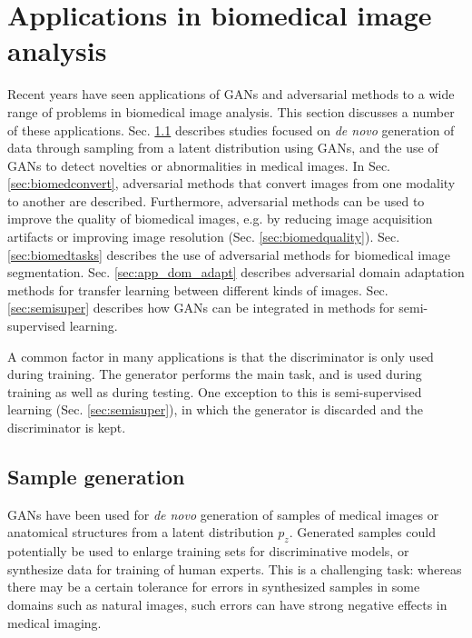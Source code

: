 \documentclass{article}
\begin{document}
\section{Applications in biomedical image analysis}
\label{sec:GANSinMIA}
Recent years have seen applications of GANs and adversarial methods to a wide range of problems in biomedical image analysis. This section discusses a number of these applications. Sec. \ref{sec:biomedsynth} describes studies focused on \textit{de novo} generation of data through sampling from a latent distribution using GANs, and the use of GANs to detect novelties or abnormalities in medical images. In Sec. \ref{sec:biomedconvert}, adversarial methods that convert images from one modality to another are described. Furthermore, adversarial methods can be used to improve the quality of biomedical images, e.g. by reducing image acquisition artifacts or improving image resolution (Sec. \ref{sec:biomedquality}). Sec. \ref{sec:biomedtasks} describes the use of adversarial methods for biomedical image segmentation. Sec. \ref{sec:app_dom_adapt} describes adversarial domain adaptation methods for transfer learning between different kinds of images. Sec. \ref{sec:semisuper} describes how GANs can be integrated in methods for semi-supervised learning.


A common factor in many applications is that the discriminator is only used during training. The generator performs the main task, and is used during training as well as during testing. One exception to this is semi-supervised learning (Sec. \ref{sec:semisuper}), in which the generator is discarded and the discriminator is kept.

\subsection{Sample generation}
\label{sec:biomedsynth}
GANs have been used for \textit{de novo} generation of samples of medical images or anatomical structures from a latent distribution $p_z$. Generated samples could potentially be used to enlarge training sets for discriminative models, or synthesize data for training of human experts. This is a challenging task: whereas there may be a certain tolerance for errors in synthesized samples in some domains such as natural images, such errors can have strong negative effects in medical imaging. 
\end{document}
